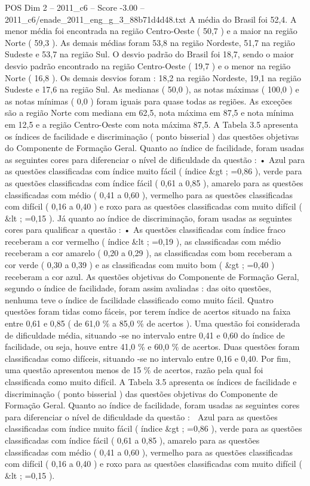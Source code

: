 \begin{textsample}{POS Dim 2 – 2011\_c6 – Score -3.00 – 2011\_c6/enade\_2011\_eng\_g\_3\_88b71d4d48.txt}
A média do Brasil foi 52,4.
A menor média foi encontrada na região Centro-Oeste ( 50,7 ) e a maior na região Norte ( 59,3 ).
As demais médias foram 53,8 na região Nordeste, 51,7 na região Sudeste e 53,7 na região Sul.
O desvio padrão do Brasil foi 18,7, sendo o maior desvio padrão encontrado na região Centro-Oeste ( 19,7 ) e o menor na região Norte ( 16,8 ).
Os demais desvios foram : 18,2 na região Nordeste, 19,1 na região Sudeste e 17,6 na região Sul.
As medianas ( 50,0 ), as notas máximas ( 100,0 ) e as notas mínimas ( 0,0 ) foram iguais para quase todas as regiões.
As exceções são a região Norte com mediana em 62,5, nota máxima em 87,5 e nota mínima em 12,5 e a região Centro-Oeste com nota máxima 87,5.
A Tabela 3.5 apresenta os índices de facilidade e discriminação ( ponto bisserial ) das questões objetivas do Componente de Formação Geral.
Quanto ao índice de facilidade, foram usadas as seguintes cores para diferenciar o nível de dificuldade da questão : • Azul para as questões classificadas com índice muito fácil ( índice \&gt ; =0,86 ), verde para as questões classificadas com índice fácil ( 0,61 a 0,85 ), amarelo para as questões classificadas com médio ( 0,41 a 0,60 ), vermelho para as questões classificadas com difícil ( 0,16 a 0,40 ) e roxo para as questões classificadas com muito difícil ( \&lt ; =0,15 ).
Já quanto ao índice de discriminação, foram usadas as seguintes cores para qualificar a questão : • As questões classificadas com índice fraco receberam a cor vermelho ( índice \&lt ; =0,19 ), as classificadas com médio receberam a cor amarelo ( 0,20 a 0,29 ), as classificadas com bom receberam a cor verde ( 0,30 a 0,39 ) e as classificadas com muito bom ( \&gt ; =0,40 ) receberam a cor azul.
As questões objetivas do Componente de Formação Geral, segundo o índice de facilidade, foram assim avaliadas : das oito questões, nenhuma teve o índice de facilidade classificado como muito fácil.
Quatro questões foram tidas como fáceis, por terem índice de acertos situado na faixa entre 0,61 e 0,85 ( de 61,0 \% a 85,0 \% de acertos ).
Uma questão foi considerada de dificuldade média, situando -se no intervalo entre 0,41 e 0,60 do índice de facilidade, ou seja, houve entre 41,0 \% e 60,0 \% de acertos.
Duas questões foram classificadas como difíceis, situando -se no intervalo entre 0,16 e 0,40.
Por fim, uma questão apresentou menos de 15 \% de acertos, razão pela qual foi classificada como muito difícil.
A Tabela 3.5 apresenta os índices de facilidade e discriminação ( ponto bisserial ) das questões objetivas do Componente de Formação Geral.
Quanto ao índice de facilidade, foram usadas as seguintes cores para diferenciar o nível de dificuldade da questão :  Azul para as questões classificadas com índice muito fácil ( índice \&gt ; =0,86 ), verde para as questões classificadas com índice fácil ( 0,61 a 0,85 ), amarelo para as questões classificadas com médio ( 0,41 a 0,60 ), vermelho para as questões classificadas com difícil ( 0,16 a 0,40 ) e roxo para as questões classificadas com muito difícil ( \&lt ; =0,15 ).

\end{textsample}
